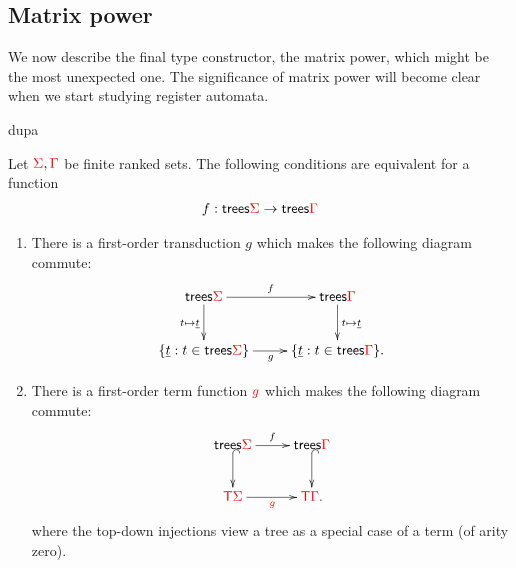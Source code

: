 \subsection{Matrix power}
We now describe the final type constructor, the matrix power, which might be the most unexpected one. The significance of matrix power will become clear when we start studying register automata.  

{
    \item dupa
}




\begin{theorem}
    Let ${\color{red}{\Sigma}},{\color{red}{\Gamma}}$ be finite ranked sets. The following conditions are equivalent for a function
    \begin{align*}
        f : \mathsf {trees} {\color{red}{\Sigma}} \to \mathsf {trees} {\color{red}{\Gamma}}
    \end{align*}
\begin{enumerate}
    \item There is a first-order transduction $g$ which makes the following diagram commute:
    \begin{align*}
        \xymatrix{
            \trees \rSigma \ar[d]_{t \mapsto \underline t}\ar[r]^f & \trees \rGamma \ar[d]^{t \mapsto \underline t} \\
            \set{\underline t : t \in \trees \rSigma} \ar[r]_g & \set{\underline t : t \in \trees \rGamma}.
        }
    \end{align*}
    \item There is a first-order term function ${\color{red}{g}}$ which makes the following diagram commute:
    \begin{align*}
        \xymatrix{
            \trees \rSigma \ar@{^{(}->}[d]\ar[r]^f & \trees \rGamma \ar@{^{(}->}[d] \\
            \tmonad \rSigma \ar[r]_{\ranked g} & \tmonad \rGamma.
        }
    \end{align*}
    where the top-down injections view a tree as a special case of a term (of arity zero).
\end{enumerate}
\end{theorem}